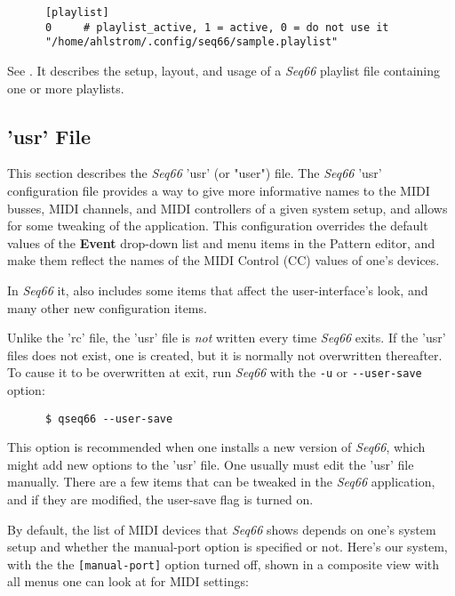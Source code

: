    \index{[playlist]}
   \begin{verbatim}
      [playlist]
      0     # playlist_active, 1 = active, 0 = do not use it
      "/home/ahlstrom/.config/seq66/sample.playlist"
   \end{verbatim}

   See .
   It describes the setup, layout, and usage of a
   \textsl{Seq66} playlist file containing one or more playlists.

\subsection{'usr' File}
\label{subsec:configuration_usr}

   This section describes the \textsl{Seq66} 'usr' (or "user") file.
   The \textsl{Seq66} 'usr'
   configuration file provides a way to give more
   informative names to the MIDI busses, MIDI channels, and MIDI controllers of
   a given system setup, and allows for some tweaking of the application.
   This configuration overrides the default values
   of the \textbf{Event} drop-down list and menu items in the Pattern editor,
   and make them reflect the names of the MIDI Control (CC) values of one's
   devices.

   In \textsl{Seq66} it, also includes some items that affect the
   user-interface's look, and many other new configuration items.

   Unlike the 'rc' file, the 'usr' file is \textsl{not} written every time
   \textsl{Seq66} exits.  If the 'usr' files does not exist, one is
   created, but it is normally not overwritten thereafter.  To
   cause it to be overwritten at exit, run \textsl{Seq66} with the
   \texttt{-u} or \texttt{-{}-user-save} option:

   \begin{verbatim}
      $ qseq66 --user-save
   \end{verbatim}

   This option is recommended when one installs a new version of
   \textsl{Seq66}, which might add new options to the 'usr' file.
   One usually must edit the 'usr' file manually.
   There are a few items that can be tweaked in the \textsl{Seq66} application,
   and if they are modified, the user-save flag is turned on.

   By default, the list of MIDI devices that \textsl{Seq66} shows depends
   on one's system setup and whether the manual-port option is specified
   or not.  Here's our system, with the
   the \texttt{[manual-port]} option turned off, shown in a
   composite view with all menus one can look at for MIDI settings:

